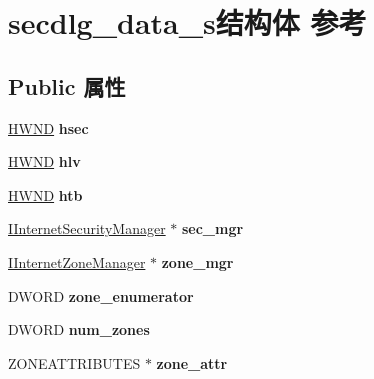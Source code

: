\hypertarget{structsecdlg__data__s}{}\section{secdlg\+\_\+data\+\_\+s结构体 参考}
\label{structsecdlg__data__s}
\subsection*{Public 属性}
\begin{DoxyCompactItemize}
\item 
\mbox{\label{structsecdlg__data__s_ad5ea803e9a620f2d34a9fa3b1c5422ae}} 
\hyperlink{interfacevoid}{H\+W\+ND} {\bfseries hsec}
\item 
\mbox{\label{structsecdlg__data__s_a678706af6f051a86a2c4288b38bb1324}} 
\hyperlink{interfacevoid}{H\+W\+ND} {\bfseries hlv}
\item 
\mbox{\label{structsecdlg__data__s_a6ec024842373288991895a388ba33788}} 
\hyperlink{interfacevoid}{H\+W\+ND} {\bfseries htb}
\item 
\mbox{\label{structsecdlg__data__s_a636dca27c8520ea1ce34479d37d5cf2e}} 
\hyperlink{interface_i_internet_security_manager}{I\+Internet\+Security\+Manager} $\ast$ {\bfseries sec\+\_\+mgr}
\item 
\mbox{\label{structsecdlg__data__s_a05685bda9ca23483492d4aafa54a80ce}} 
\hyperlink{interface_i_internet_zone_manager}{I\+Internet\+Zone\+Manager} $\ast$ {\bfseries zone\+\_\+mgr}
\item 
\mbox{\label{structsecdlg__data__s_abc2663ee38bae489f6ad41ac401a61a6}} 
D\+W\+O\+RD {\bfseries zone\+\_\+enumerator}
\item 
\mbox{\label{structsecdlg__data__s_af3863ddc29b35f9cacfa70b0adafe411}} 
D\+W\+O\+RD {\bfseries num\+\_\+zones}
\item 
\mbox{\label{structsecdlg__data__s_aebf1792635ce3fd26cbd8514a3f35661}} 
Z\+O\+N\+E\+A\+T\+T\+R\+I\+B\+U\+T\+ES $\ast$ {\bfseries zone\+\_\+attr}

\end{DoxyCompactItemize}
